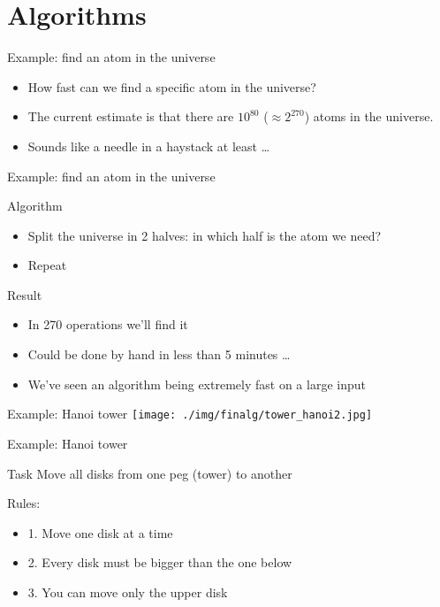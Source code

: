 \documentclass[presentation]{beamer}
\begin{document}
\section{Algorithms}
\label{sec-2}
\begin{frame}[label=sec-2-1]{Example: find an atom in the universe}
\begin{itemize}
\item How fast can we find a specific atom in the universe?
\item The current estimate is that there are $10^{80}$ ($\approx2^{270}$) atoms in the universe.
\item Sounds like a needle in a haystack at least \ldots{}
\end{itemize}
\end{frame}
\begin{frame}[label=sec-2-2]{Example: find an atom in the universe}
\begin{block}{Algorithm}
\begin{itemize}
\item Split the universe in 2 halves: in which half is the atom we need?
\item Repeat
\end{itemize}
\end{block}
\begin{block}{Result}
\begin{itemize}
\item In 270 operations we'll find it
\item Could be done by hand in less than 5 minutes \ldots{}
\item We've seen an algorithm being extremely fast on a large input
\end{itemize}
\end{block}
\end{frame}
\begin{frame}[label=sec-2-3]{Example: Hanoi tower}
\texttt{[image: ./img/finalg/tower\_hanoi2.jpg]}
\end{frame}
\begin{frame}[label=sec-2-4]{Example: Hanoi tower}
\begin{block}{Task}
Move all disks from one peg (tower) to another
\end{block}
\begin{block}{Rules:}
\begin{itemize}
\item 1. Move one disk at a time
\item 2. Every disk must be bigger than the one below
\item 3. You can move only the upper disk
\end{itemize}
\end{block}
\end{frame}
\end{document}
